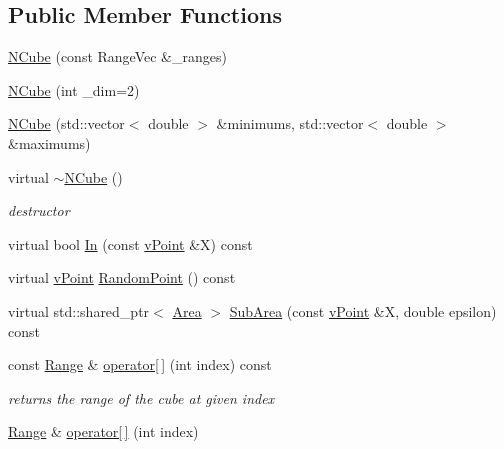 \subsection*{Public Member Functions}
\begin{DoxyCompactItemize}
\item 
\hyperlink{class_n_cube_ac5458bbe42846badcbd2100825a76556}{N\+Cube} (const Range\+Vec \&\+\_\+ranges)
\item 
\hyperlink{class_n_cube_a2eeaca555a32a13ed8fc58e2e83b1ec4}{N\+Cube} (int \+\_\+dim=2)
\item 
\hyperlink{class_n_cube_a6b4535debc936abca85e563f5b4e1d67}{N\+Cube} (std\+::vector$<$ double $>$ \&minimums, std\+::vector$<$ double $>$ \&maximums)
\item 
\mbox{\label{class_n_cube_a7c2e9733c2a48e1c60397321166d688a}} 
virtual \hyperlink{class_n_cube_a7c2e9733c2a48e1c60397321166d688a}{$\sim$\+N\+Cube} ()
\begin{DoxyCompactList}\small\item\em destructor \end{DoxyCompactList}\item 
virtual bool \hyperlink{class_n_cube_a042595f5e33795b2b454c2da3e9f13e0}{In} (const \hyperlink{classv_point}{v\+Point} \&X) const
\item 
virtual \hyperlink{classv_point}{v\+Point} \hyperlink{class_n_cube_a44e37293282724b0454c4542fa001c60}{Random\+Point} () const
\item 
virtual std\+::shared\+\_\+ptr$<$ \hyperlink{class_area}{Area} $>$ \hyperlink{class_n_cube_a88be716167199c626d1c5063b6929303}{Sub\+Area} (const \hyperlink{classv_point}{v\+Point} \&X, double epsilon) const
\item 
\mbox{\label{class_n_cube_a14a756408e6b20bb3537cc1e32f9032d}} 
const \hyperlink{class_range}{Range} \& \hyperlink{class_n_cube_a14a756408e6b20bb3537cc1e32f9032d}{operator\mbox{[}$\,$\mbox{]}} (int index) const
\begin{DoxyCompactList}\small\item\em returns the range of the cube at given index \end{DoxyCompactList}\item 
\mbox{\label{class_n_cube_a6018d8b57d76586cec10b6e4a2741e44}} 
\hyperlink{class_range}{Range} \& \hyperlink{class_n_cube_a6018d8b57d76586cec10b6e4a2741e44}{operator\mbox{[}$\,$\mbox{]}} (int index)

\end{DoxyCompactItemize}
